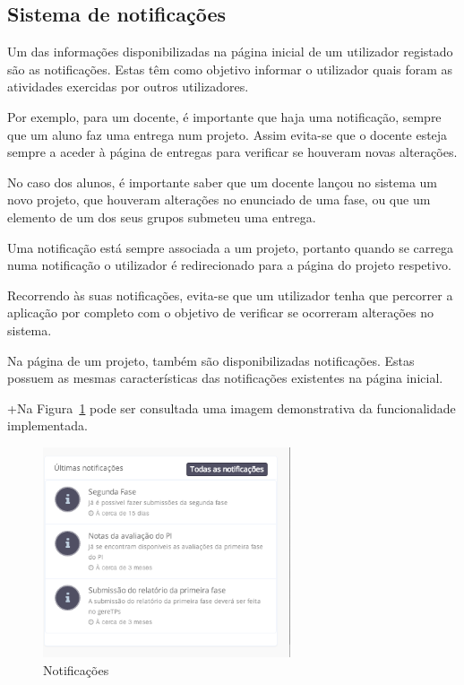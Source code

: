 \subsection{Sistema de notificações}

Um das informações disponibilizadas na página inicial de um utilizador registado são as notificações. Estas têm como objetivo informar o utilizador quais foram as atividades exercidas por outros utilizadores.

Por exemplo, para um docente, é importante que haja uma notificação, sempre que um aluno faz uma entrega num projeto. Assim evita-se que o docente esteja sempre a aceder à página de entregas para verificar se houveram novas alterações.

No caso dos alunos, é importante saber que um docente lançou no sistema um novo projeto, que houveram alterações no enunciado de uma fase, ou que um elemento de um dos seus grupos submeteu uma entrega.

Uma notificação está sempre associada a um projeto, portanto quando se carrega numa notificação o utilizador é redirecionado para a página do projeto respetivo.

Recorrendo às suas notificações, evita-se que um utilizador tenha que percorrer a aplicação por completo com o objetivo de verificar se ocorreram alterações no sistema.

Na página de um projeto, também são disponibilizadas notificações. Estas possuem as mesmas características das notificações existentes na página inicial.

+Na Figura~\ref{fig:notifications} pode ser consultada uma imagem demonstrativa da funcionalidade implementada.

\begin{figure}[H]
  \centering
  \includegraphics[width=0.65\textwidth,center]{images/implementacao/alunos/notifications}
  \caption{Notificações}
  \label{fig:notifications}
\end{figure}

